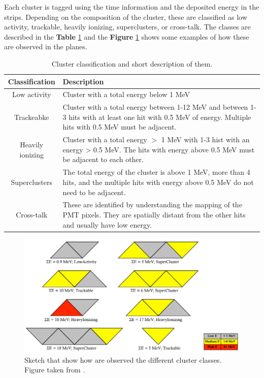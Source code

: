 Each cluster is tagged using the time information and the deposited energy in the strips. Depending on the composition of the cluster, these are classified as low activity, trackable, heavily ionizing, superclusters, or cross-talk. The classes are described in the \textbf{Table} \ref{tab:MnvExp:MnvDetector:DataReconstruction:Clustering:ClusterClasses} and the \textbf{Figure} \ref{fig:MnvExp:MnvDetector:DataReconstruction:Clustering:ClusterSketch} shows some examples of how these are observed in the planes.

\begin{table}[!htb]
    \centering
    \begin{tabular}{c|p{3.5in}}
        Classification & Description \\ \hline
        Low activity & Cluster with a total energy below 1 MeV\\ \hline
        Trackeabke & Cluster with a total energy between 1-12 MeV and between 1-3 hits with at least one hit with 0.5 MeV of energy. Multiple hits with 0.5 MeV must be adjacent.\\ \hline
        Heavily ionizing & Cluster with a total energy $>$ 1 MeV with 1-3 hist with an energy > 0.5 MeV. The hits with energy above 0.5 MeV must be adjacent to each other. \\ \hline
        Superclusters & The total energy of the cluster is above 1 MeV, more than 4 hits, and the multiple hits with energy above 0.5 MeV do not need to be adjacent. \\ \hline
        Cross-talk & These are identified by understanding the mapping of the PMT pixels. They are spatially distant from the other hits and usually have low energy.\\ \hline
    \end{tabular}
    \caption{Cluster classification and short description of them.}
    \label{tab:MnvExp:MnvDetector:DataReconstruction:Clustering:ClusterClasses}
\end{table}



\begin{figure} [!htb]
    \centering
    \includegraphics[scale=0.5]{Figures/Chapter2/ClusterScketch.png}
    \caption{Sketch that show how are observed the different cluster classes. Figure taken from \cite{PerduePresentation}.}
    \label{fig:MnvExp:MnvDetector:DataReconstruction:Clustering:ClusterSketch}
\end{figure}

